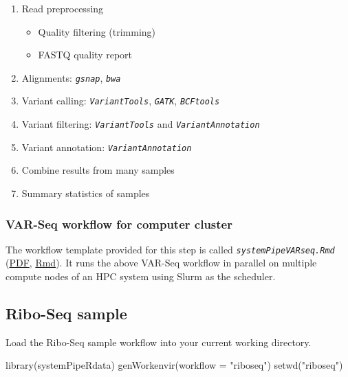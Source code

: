 \documentclass[14pt,]{article}
\providecommand{\tightlist}{%
  \setlength{\itemsep}{0pt}\setlength{\parskip}{0pt}}
\newcommand{\hlstr}[1]{\textcolor[rgb]{0.251,0.627,0.251}{#1}}%
\newcommand{\hlstd}[1]{\textcolor[rgb]{0.251,0.251,0.251}{#1}}%
\newenvironment{Shaded}{\begin{myshaded}}{\end{myshaded}}
\newcommand{\StringTok}[1]{\hlstr{#1}}
\newcommand{\FunctionTok}[1]{\hlstd{#1}}
\newcommand{\AttributeTok}[1]{{#1}}
\newcommand{\NormalTok}[1]{\hlstd{#1}}
\begin{document}
\begin{enumerate}
\def\labelenumi{\arabic{enumi}.}
\tightlist
\item
  Read preprocessing

  \begin{itemize}
  \tightlist
  \item
    Quality filtering (trimming)
  \item
    FASTQ quality report
  \end{itemize}
\item
  Alignments: \emph{\texttt{gsnap}}, \emph{\texttt{bwa}}
\item
  Variant calling: \emph{\texttt{VariantTools}}, \emph{\texttt{GATK}}, \emph{\texttt{BCFtools}}
\item
  Variant filtering: \emph{\texttt{VariantTools}} and \emph{\texttt{VariantAnnotation}}
\item
  Variant annotation: \emph{\texttt{VariantAnnotation}}
\item
  Combine results from many samples
\item
  Summary statistics of samples
\end{enumerate}

\hypertarget{var-seq-workflow-for-computer-cluster}{%
\subsubsection{VAR-Seq workflow for computer cluster}\label{var-seq-workflow-for-computer-cluster}}

The workflow template provided for this step is called \emph{\texttt{systemPipeVARseq.Rmd}} (\href{https://github.com/tgirke/systemPipeRdata/blob/master/inst/extdata/workflows/varseq/systemPipeVARseq.pdf?raw=true}{PDF}, \href{https://github.com/tgirke/systemPipeRdata/blob/master/inst/extdata/workflows/varseq/systemPipeVARseq.Rmd}{Rmd}).
It runs the above VAR-Seq workflow in parallel on multiple compute nodes of an HPC system using Slurm as the scheduler.

\hypertarget{ribo-seq-sample}{%
\subsection{Ribo-Seq sample}\label{ribo-seq-sample}}

Load the Ribo-Seq sample workflow into your current working directory.

\begin{Shaded}
\begin{Highlighting}[]
\FunctionTok{library}\NormalTok{(systemPipeRdata)}
\FunctionTok{genWorkenvir}\NormalTok{(}\AttributeTok{workflow =} \StringTok{"riboseq"}\NormalTok{)}
\FunctionTok{setwd}\NormalTok{(}\StringTok{"riboseq"}\NormalTok{)}
\end{Highlighting}
\end{Shaded}
\end{document}
